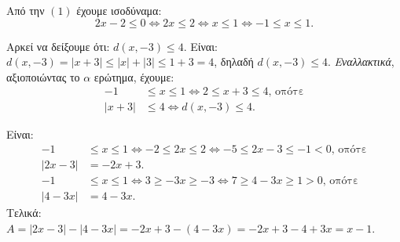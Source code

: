 
\begin{alist}
\item Από την $(1)$ έχουμε ισοδύναμα:
\[2x - 2 \le 0 \Leftrightarrow 2x \le 2 \Leftrightarrow x \le 1 \Leftrightarrow -1 \le x \le 1.\]

\item Αρκεί να δείξουμε ότι: $d(x, -3) \le 4$.
Είναι: $d(x, -3) = |x + 3| \le |x| + |3| \le 1 + 3 = 4$, δηλαδή $d(x, -3) \le 4$.
\textit{Εναλλακτικά}, αξιοποιώντας το $\alpha$ ερώτημα, έχουμε:
\begin{align*}
-1 &\le x \le 1 \Leftrightarrow 2 \le x + 3 \le 4\text{, οπότε} \\
|x + 3| &\le 4 \Leftrightarrow d(x, -3) \le 4.
\end{align*}

\item Είναι:
\begin{align*}
-1 &\le x \le 1 \Leftrightarrow -2 \le 2x \le 2 \Leftrightarrow -5 \le 2x - 3 \le -1 < 0\text{, οπότε} \\
|2x - 3| &= -2x + 3. \\
-1 &\le x \le 1 \Leftrightarrow 3 \ge -3x \ge -3 \Leftrightarrow 7 \ge 4 - 3x \ge 1 > 0\text{, οπότε} \\
|4 - 3x| &= 4 - 3x.
\end{align*}
Τελικά: $A = |2x - 3| - |4 - 3x| = -2x + 3 - (4 - 3x) = -2x + 3 - 4 + 3x = x - 1$.
\end{alist}

